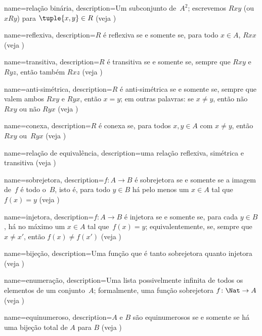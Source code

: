  {
  name=relação binária,
  description={Um subconjunto de~$A^{2}$; escrevemos $Rxy$ (ou $xRy$) para
    $\tuple{x, y} \in R$ (veja )} }

 {
  name=reflexiva,
  description={$R$ é reflexiva se e somente se, para todo $x \in A$, $Rxx$ (veja
    )} }

 {
  name=transitiva,
  description={$R$ é transitiva se e somente se, sempre que $Rxy$ e $Ryz$, então
    também $Rxz$ (veja )} }

 {
  name=anti-simétrica,
  description={$R$ é anti-simétrica se e somente se, sempre que valem ambos $Rxy$ e
    $Ryx$, então $x=y$; em outras palavras: se $x\neq y$, então não $Rxy$ ou
    não $Ryx$ (veja )} }

 {
  name=conexa,
  description={$R$ é conexa se, para todos $x, y\in A$
    com $x \neq y$, então $Rxy$ ou~$Ryx$ (veja
    )} }

 {
  name={relação de equivalência}, 
  description={uma relação reflexiva, simétrica e transitiva (veja
    )} }

 {
  name={sobrejetora},
  description={$f \colon A \to B$ é {sobrejetora} se e somente se a
    imagem de~$f$ é todo o~$B$, isto é, para todo $y \in B$ há pelo
    menos um $x \in A$ tal que~$f(x) = y$ (veja
    )} }

 {
  name={injetora}, 
  description={$f \colon A \to B$ é {injetora} se e somente se, para
    cada $y \in B$, há no máximo um $x \in A$ tal que~$f(x) =
    y$; equivalentemente, se, sempre que $x \neq x'$, então $f(x) \neq f(x')$
    (veja )} }

 {
  name={bijeção},  
  description={Uma função que é tanto {sobrejetora} quanto
    {injetora} (veja )} }

 {
  name=enumeração,  
  description={Uma lista possivelmente infinita de todos os
    {elementos} de um conjunto~$A$; formalmente, uma função sobrejetora
    $f\colon \Nat \to A$ (veja )} }

 {
  name=equinumeroso,
  description={$A$ e $B$ são equinumerosos se e somente se há uma bijeção
    total de $A$ para $B$ (veja )} }

